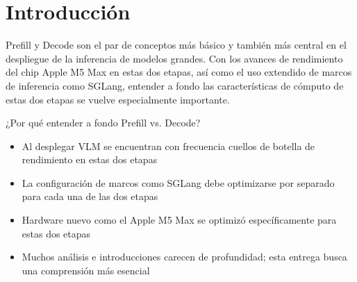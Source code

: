\section{Introducción}

Prefill y Decode son el par de conceptos más básico y también más central en el despliegue de la inferencia de modelos grandes. Con los avances de rendimiento del chip Apple M5 Max en estas dos etapas, así como el uso extendido de marcos de inferencia como SGLang, entender a fondo las características de cómputo de estas dos etapas se vuelve especialmente importante.

\begin{knowledgebox}{¿Por qué entender a fondo Prefill vs. Decode?}
\begin{itemize}
  \item Al desplegar VLM se encuentran con frecuencia cuellos de botella de rendimiento en estas dos etapas
  \item La configuración de marcos como SGLang debe optimizarse por separado para cada una de las dos etapas
  \item Hardware nuevo como el Apple M5 Max se optimizó específicamente para estas dos etapas
  \item Muchos análisis e introducciones carecen de profundidad; esta entrega busca una comprensión más esencial
\end{itemize}
\end{knowledgebox}

